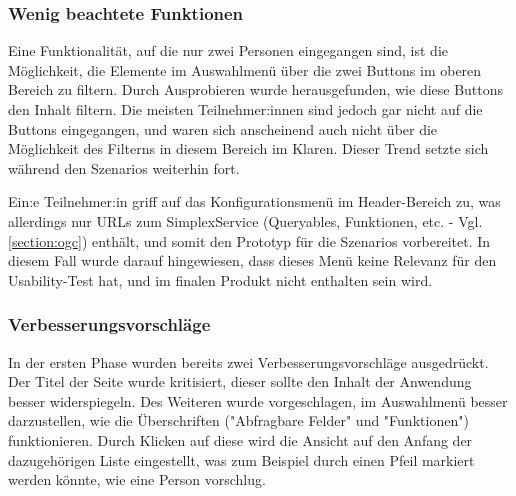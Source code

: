 \subsubsection{Wenig beachtete Funktionen}

Eine Funktionalität, auf die nur zwei Personen eingegangen sind, ist die Möglichkeit, die Elemente im Auswahlmenü über die zwei Buttons im oberen Bereich zu filtern. Durch Ausprobieren wurde herausgefunden, wie diese Buttons den Inhalt filtern. Die meisten Teilnehmer:innen sind jedoch gar nicht auf die Buttons eingegangen, und waren sich anscheinend auch nicht über die Möglichkeit des Filterns in diesem Bereich im Klaren. Dieser Trend setzte sich während den Szenarios weiterhin fort.

Ein:e Teilnehmer:in griff auf das Konfigurationsmenü im Header-Bereich zu, was allerdings nur \acsp{URL} zum SimplexService (Queryables, Funktionen, etc. - Vgl. \ref{section:ogc}) enthält, und somit den Prototyp für die Szenarios vorbereitet. In diesem Fall wurde darauf hingewiesen, dass dieses Menü keine Relevanz für den Usability-Test hat, und im finalen Produkt nicht enthalten sein wird.

\subsubsection{Verbesserungsvorschläge}

In der ersten Phase wurden bereits zwei Verbesserungsvorschläge ausgedrückt. Der Titel der Seite wurde kritisiert, dieser sollte den Inhalt der Anwendung besser widerspiegeln. Des Weiteren wurde vorgeschlagen, im Auswahlmenü besser darzustellen, wie die Überschriften ("Abfragbare Felder" und "Funktionen") funktionieren. Durch Klicken auf diese wird die Ansicht auf den Anfang der dazugehörigen Liste eingestellt, was zum Beispiel durch einen Pfeil markiert werden könnte, wie eine Person vorschlug.
